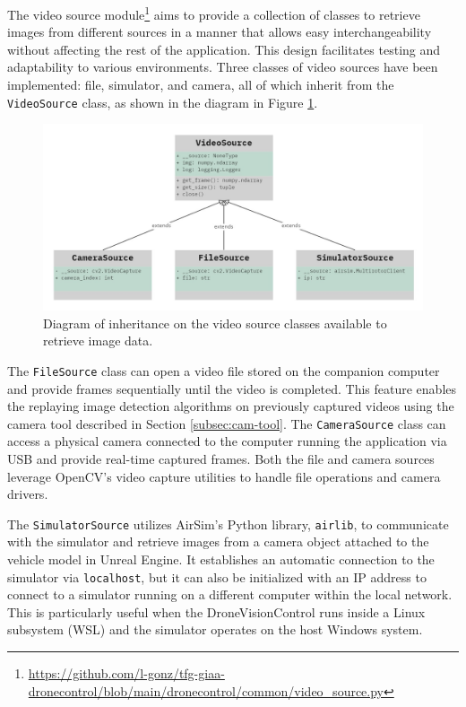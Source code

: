 The video source module\footnote{\url{https://github.com/l-gonz/tfg-giaa-dronecontrol/blob/main/dronecontrol/common/video_source.py}} aims to provide a collection of classes to retrieve images from different sources in a manner that allows easy interchangeability without affecting the rest of the application. 
This design facilitates testing and adaptability to various environments. Three classes of video sources have been implemented: file, simulator, and camera, all of which inherit from the \texttt{VideoSource} class, as shown in the diagram in Figure \ref{fig:video-source-inheritance}.

\begin{figure}
  \centering
  \includegraphics[width=\textwidth, keepaspectratio]{img/uml-video-source.jpg}
  \caption{Diagram of inheritance on the video source classes available to retrieve image data.}
  \label{fig:video-source-inheritance}
\end{figure}

The \texttt{FileSource} class can open a video file stored on the companion computer and provide frames sequentially until the video is completed. This feature enables the replaying image detection algorithms on previously captured videos using the camera tool described in Section \ref{subsec:cam-tool}. The \texttt{CameraSource} class can access a physical camera connected to the computer running the application via USB and provide real-time captured frames. Both the file and camera sources leverage OpenCV's video capture utilities to handle file operations and camera drivers.

The \texttt{SimulatorSource} utilizes AirSim's Python library, \texttt{airlib}, to communicate with the simulator and retrieve images from a camera object attached to the vehicle model in Unreal Engine. It establishes an automatic connection to the simulator via \texttt{localhost}, but it can also be initialized with an IP address to connect to a simulator running on a different computer within the local network. This is particularly useful when the DroneVisionControl runs inside a Linux subsystem (WSL) and the simulator operates on the host Windows system.

